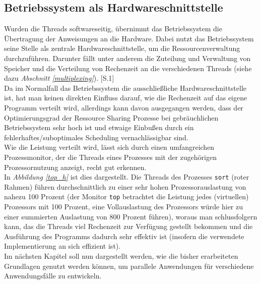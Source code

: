 \subsection{Betriebssystem als Hardwareschnittstelle}
Wurden die Threads softwareseitig, übernimmt das Betriebssystem die Übertragung der Anweisungen an die Hardware. Dabei nutzt das Betriebssystem seine Stelle als zentrale Hardwareschnittstelle, um die Ressourcenverwaltung durchzuführen. Darunter fällt unter anderem die Zuteilung und Verwaltung von Speicher und die Verteilung von Rechenzeit an die verschiedenen Threads (siehe dazu \textit{Abschnitt \ref{multiplexing}}). \cite{Strey_Konzepte_von_Betriebssystemen}[S.1]\\
Da im Normalfall das Betriebssystem die ausschließliche Hardwareschnittstelle ist, hat man keinen direkten Einfluss darauf, wie die Rechenzeit auf das eigene Programm verteilt wird, allerdings kann davon ausgegangen werden, dass der Optimierungsgrad der Ressource Sharing Prozesse bei gebräuchlichen Betriebssystem sehr hoch ist und etwaige Einbußen durch ein fehlerhaftes/suboptimales Scheduling vernachlässigbar sind.\\
Wie die Leistung verteilt wird, lässt sich durch einen umfangreichen Prozessmonitor, der die Threads eines Prozesses mit der zugehörigen Prozessornutzung anzeigt, recht gut erkennen.\\
In \textit{Abbildung \ref{top_h}} ist dies dargestellt. Die Threads des Prozesses \texttt{sort} (roter Rahmen) führen durchschnittlich zu einer sehr hohen Prozessorauslastung von nahezu 100 Prozent (der Monitor \texttt{top} betrachtet die Leistung jedes (virtuellen) Prozessors mit 100 Prozent, eine Vollauslastung des Prozessors würde hier zu einer summierten Auslastung von 800 Prozent führen), woraus man schlussfolgern kann, das die Threads viel Rechenzeit zur Verfügung gestellt bekommen und die Ausführung des Programms dadurch sehr effektiv ist (insofern die verwendete Implementierung an sich effizient ist).\\[0.5 cm]
Im nächsten Kapitel soll nun dargestellt werden, wie die bisher erarbeiteten Grundlagen genutzt werden können, um parallele Anwendungen für verschiedene Anwendungsfälle zu entwickeln.
